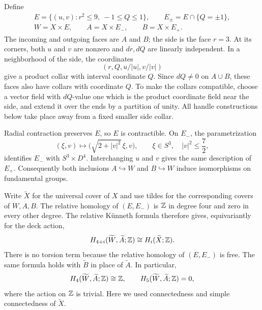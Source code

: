 Define
\begin{equation}
 \begin{gathered}
 E=\{(u,v):r^2\leq 9,\ -1\leq Q\leq 1\},
 \qquad E_{\pm}=E\cap\{Q=\pm1\},\\
 W=X\times E,\qquad A=X\times E_-,\qquad B=X\times E_+.
 \end{gathered}
 \label{eq:relative-domain}
\end{equation}
The incoming and outgoing faces are $A$ and $B$; the side is the face
$r=3$.  At its corners, both $u$ and $v$ are nonzero and $dr,dQ$ are
linearly independent.  In a neighborhood of the side, the coordinates
\[
 (r,Q,u/|u|,v/|v|)
\]
give a product collar with interval coordinate $Q$.  Since $dQ\neq0$ on
$A\cup B$, these faces also have collars with coordinate $Q$.  To make
the collars compatible, choose a vector field with $dQ$-value one which
is the product coordinate field near the side, and extend it over the
ends by a partition of unity.  All handle constructions below take place
away from a fixed smaller side collar.

Radial contraction preserves $E$, so $E$ is contractible.  On $E_-$,
the parametrization
\[
 (\xi,v)\longmapsto
 \bigl(\sqrt{2+|v|^2}\,\xi,v\bigr),
 \qquad \xi\in S^3,\quad |v|^2\leq\frac72,
\]
identifies $E_-$ with $S^3\times D^4$.  Interchanging $u$ and $v$ gives
the same description of $E_+$.  Consequently both inclusions
$A\hookrightarrow W$ and $B\hookrightarrow W$ induce isomorphisms on
fundamental groups.

Write $\widetilde X$ for the universal cover of $X$ and use tildes for
the corresponding covers of $W,A,B$.  The relative homology of
$(E,E_-)$ is $\mathbb Z$ in degree four and zero in every other degree.  The
relative K\"unneth formula therefore gives, equivariantly for the deck
action,
\begin{equation}
 H_{4+i}(\widetilde W,\widetilde A;\mathbb Z)
 \cong H_i(\widetilde X;\mathbb Z).
 \label{eq:relative-homology}
\end{equation}
There is no torsion term because the relative homology of $(E,E_-)$ is
free.  The same formula holds with $\widetilde B$ in place of
$\widetilde A$.  In particular,
\begin{equation}
 H_4(\widetilde W,\widetilde A;\mathbb Z)\cong\mathbb Z,
 \qquad H_5(\widetilde W,\widetilde A;\mathbb Z)=0,
 \label{eq:low-relative-homology}
\end{equation}
where the action on $\mathbb Z$ is trivial.  Here we used connectedness and
simple connectedness of $\widetilde X$.

